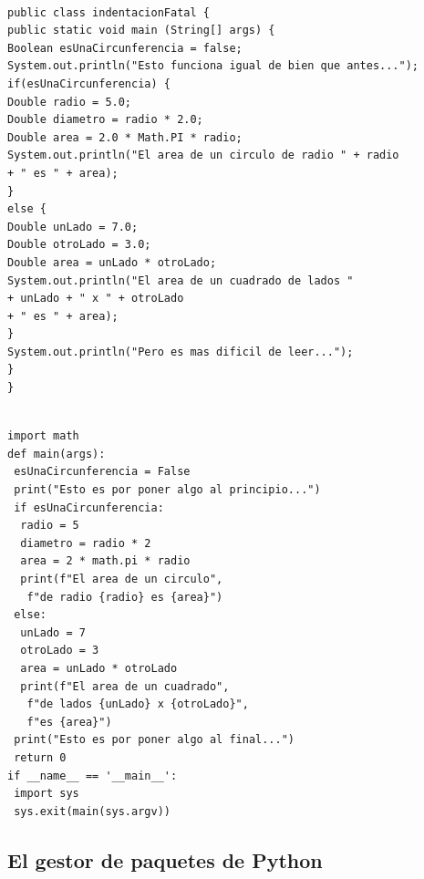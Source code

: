 \documentclass[spanish,12pt,a4paper,final,oneside]{book}
\begin{document}
\begin{lstlisting}[frame=single, caption=lenguaje Java : indentación lo peor posible]

public class indentacionFatal {
public static void main (String[] args) {
Boolean esUnaCircunferencia = false;
System.out.println("Esto funciona igual de bien que antes...");
if(esUnaCircunferencia) {
Double radio = 5.0;
Double diametro = radio * 2.0;
Double area = 2.0 * Math.PI * radio;
System.out.println("El area de un circulo de radio " + radio 
+ " es " + area);
}
else {
Double unLado = 7.0;
Double otroLado = 3.0;
Double area = unLado * otroLado;
System.out.println("El area de un cuadrado de lados "
+ unLado + " x " + otroLado 
+ " es " + area);
}
System.out.println("Pero es mas dificil de leer...");
}
}
\end{lstlisting}


\begin{lstlisting}[frame=single, caption=lenguaje Python : indentación lo peor posible]

import math
def main(args):
 esUnaCircunferencia = False
 print("Esto es por poner algo al principio...")
 if esUnaCircunferencia:
  radio = 5
  diametro = radio * 2
  area = 2 * math.pi * radio
  print(f"El area de un circulo",
   f"de radio {radio} es {area}")
 else:
  unLado = 7
  otroLado = 3
  area = unLado * otroLado
  print(f"El area de un cuadrado",
   f"de lados {unLado} x {otroLado}",
   f"es {area}")
 print("Esto es por poner algo al final...")
 return 0
if __name__ == '__main__':
 import sys
 sys.exit(main(sys.argv))
\end{lstlisting}


\subsection{El gestor de paquetes de Python}
\end{document}
